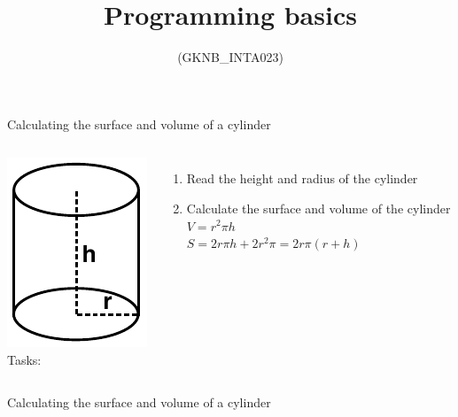 \documentclass[usenames,dvipsnames,aspectratio=169]{beamer}
\title[Lecture 5.]{Programming basics}
\subtitle{(GKNB\_INTA023)}
\begin{document}
\begin{frame}[plain]
  \titlepage
\end{frame}

\begin{frame}{Calculating the surface and volume of a cylinder}
  \begin{columns}[T]
      \hfill \includegraphics{cylinder.pdf}\\
      Tasks:
      \begin{enumerate}
        \item Read the height and radius of the cylinder
        \item Calculate the surface and volume of the cylinder\\
          $V = r^2\pi h$\\
          $S = 2r\pi h + 2r^2\pi = 2r\pi(r+h)$\\
      \end{enumerate}
      \vfill
  \end{columns}
  \begin{center}
  \end{center}
\end{frame}

\begin{frame}{Calculating the surface and volume of a cylinder}
    \begin{exampleblock}{}
    \footnotesize
    
  \end{exampleblock}
\end{frame}
\end{document}
